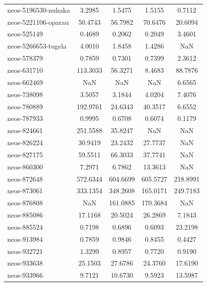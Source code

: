 \begin{longtable}{lcccc}
neos-5196530-nuhaka         &    3.2985 &   1.5475 &    1.5155 &    0.7112 \\
neos-5221106-oparau         &   50.4743 &  56.7982 &   70.6476 &   20.6094 \\
neos-525149                 &    0.4689 &   0.2062 &    0.2049 &    3.4601 \\
neos-5266653-tugela         &    4.0010 &   1.8458 &    1.4286 &       NaN \\
neos-578379                 &    0.7859 &   0.7301 &    0.7399 &    2.3612 \\
neos-631710                 &  113.3033 &  56.3271 &    8.4683 &   88.7876 \\
neos-662469                 &       NaN &      NaN &       NaN &    6.6565 \\
neos-738098                 &    3.5057 &   3.1844 &    4.0204 &    7.4076 \\
neos-780889                 &  192.9761 &  24.6343 &   40.3517 &    6.6552 \\
neos-787933                 &    0.9995 &   0.6708 &    0.6074 &    0.1179 \\
neos-824661                 &  251.5588 &  35.8247 &       NaN &       NaN \\
neos-826224                 &   30.9419 &  23.2432 &   27.7737 &       NaN \\
neos-827175                 &   59.5511 &  66.3033 &   37.7741 &       NaN \\
neos-860300                 &    7.2971 &   6.7862 &   13.3613 &       NaN \\
neos-872648                 &  572.6344 & 604.6699 &  605.5727 &  218.8991 \\
neos-873061                 &  333.1354 & 348.2608 &  165.0171 &  249.7183 \\
neos-876808                 &       NaN & 161.0885 &  170.3684 &       NaN \\
neos-885086                 &   17.1168 &  20.5024 &   26.2869 &    7.1843 \\
neos-885524                 &    0.7198 &   0.6896 &    0.6093 &   23.2198 \\
neos-913984                 &    0.7859 &   0.9846 &    0.8455 &    0.4427 \\
neos-932721                 &    1.3299 &   0.8957 &    0.7720 &    0.9190 \\
neos-933638                 &   25.1503 &  27.6786 &   24.3760 &   17.6190 \\
neos-933966                 &    9.7121 &  10.6730 &    9.5923 &   13.5987 \\

\end{longtable}
